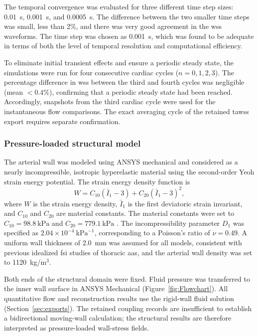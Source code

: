 \documentclass[12pt,a4paper]{article}
\newcommand{\FSI}{\ac{fsi}\xspace}
\newcommand{\WSS}{\ac{wss}\xspace}
\newcommand{\TAWSS}{\ac{tawss}\xspace}
\newcommand{\AANs}{\acp{aa}\xspace}
\theoremstyle{definition}
\numberwithin{equation}{section}
\begin{document}
The temporal convergence was evaluated for three different time step sizes: 0.01~s, 0.001~s, and 0.0005~s. The difference between the two smaller time steps was small, less than 2\%, and there was very good agreement in the \WSS waveforms. The time step was chosen as 0.001~s, which was found to be adequate in terms of both the level of temporal resolution and computational efficiency.

To eliminate initial transient effects and ensure a periodic steady state, the simulations were run for four consecutive cardiac cycles (\(n = 0,1,2,3\)). The percentage difference in \WSS between the third and fourth cycles was negligible (mean \(< 0.4\%\)), confirming that a periodic steady state had been reached. Accordingly, snapshots from the third cardiac cycle were used for the instantaneous flow comparisons. The exact averaging cycle of the retained \TAWSS export requires separate confirmation.



\subsubsection{Pressure-loaded structural model}

The arterial wall was modeled using ANSYS mechanical and considered as a nearly incompressible, isotropic hyperelastic material using the second-order Yeoh strain energy potential. The strain energy density function is
\begin{equation}
W = C_{10}(\bar{I}_1 - 3) + C_{20}(\bar{I}_1 - 3)^2,
\label{eq:yeoh}
\end{equation}
where \(W\) is the strain energy density, \(\bar{I}_1\) is the first deviatoric strain invariant, and \(C_{10}\) and \(C_{20}\) are material constants. The material constants were set to \(C_{10} = 98.8~\text{kPa}\) and \(C_{20} = 779.1~\text{kPa}\) \cite{zhu2025combined}. The incompressibility parameter \(D_1\) was specified as \(2.04 \times 10^{-4}~\text{kPa}^{-1}\), corresponding to a Poisson's ratio of \(\nu = 0.49\). A uniform wall thickness of 2.0~mm was assumed for all models, consistent with previous idealized \FSI studies of thoracic \AANs, and the arterial wall density was set to 1120~kg/m\(^3\).

Both ends of the structural domain were fixed. Fluid pressure was transferred to the inner wall surface in ANSYS Mechanical (Figure~\ref{fig:Flowchart}). All quantitative flow and reconstruction results use the rigid-wall fluid solution (Section~\ref{sec:exports}). The retained coupling records are insufficient to establish a bidirectional moving-wall calculation; the structural results are therefore interpreted as pressure-loaded wall-stress fields.
\end{document}

